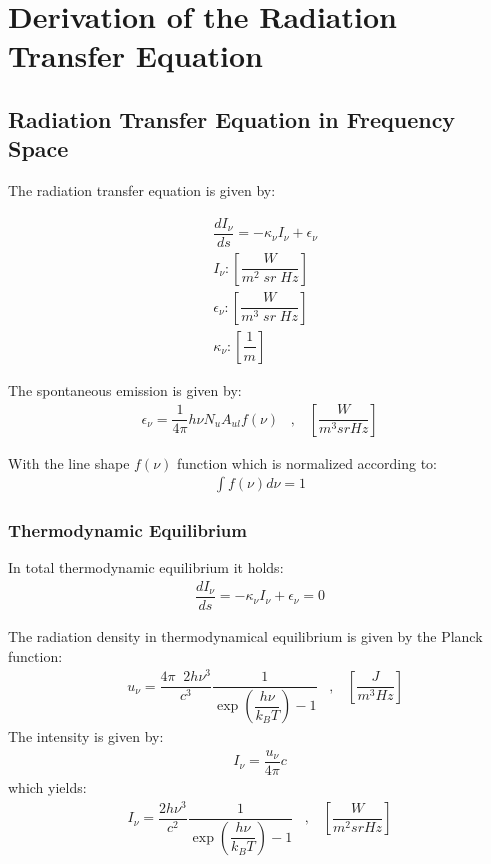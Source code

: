 \section{Derivation of the Radiation Transfer Equation}

\subsection{Radiation Transfer Equation in Frequency Space}

The radiation transfer equation is given by:

\begin{align}
&\dfrac{d I_{\nu}}{ds} = - \kappa_{\nu} I_{\nu} + \epsilon_{\nu} \\
&I_{\nu}        : \left[\dfrac{W}{m^2 \; sr \; Hz}\right] \\
&\epsilon_{\nu} : \left[\dfrac{W}{m^3 \; sr \; Hz}\right] \\
&\kappa_{\nu}   : \left[\dfrac{1}{m}\right]
\end{align}

The spontaneous emission is given by: 
\begin{align}
\epsilon_{\nu} = \dfrac{1}{4 \pi} h \nu N_u A_{ul} f(\nu) \;\;\; , \;\;\; \left[\dfrac{W}{m^3 sr Hz}\right]
\end{align}

With the line shape $f(\nu)$ function which is normalized according to:
\begin{align}
\int f(\nu) d\nu = 1
\end{align}

\subsubsection{Thermodynamic Equilibrium}

In total thermodynamic equilibrium it holds:
\begin{align}
\dfrac{d I_{\nu}}{ds} = - \kappa_{\nu} I_{\nu} + \epsilon_{\nu} = 0
\end{align}

The radiation density in thermodynamical equilibrium is given by the Planck function:
\begin{align}
	&u_{\nu} = \dfrac{4 \pi \;\; 2 h \nu^3}{c^3}  \dfrac{1}{\exp\left(\dfrac{h \nu}{k_B T}\right) - 1} \;\;\; , \;\;\; \left[\dfrac{J}{m^3 Hz}\right]
\end{align}
The intensity is given by:
\begin{align}
	I_{\nu} = \dfrac{u_{\nu}}{4 \pi} c
\end{align}
which yields:
\begin{align}
	I_{\nu} = \dfrac{2 h \nu^3}{c^2}  \dfrac{1}{\exp\left(\dfrac{h\nu}{k_B T}\right) - 1} \;\;\; , \;\;\; \left[\dfrac{W}{m^2 sr Hz}\right]
\end{align}

